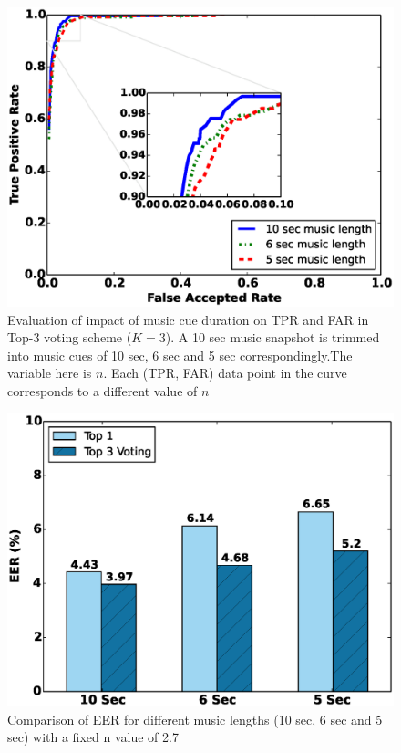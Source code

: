\begin{figure}[t]
\centering
\includegraphics [width=\columnwidth]{figure/top3_roc.eps}
\caption{Evaluation of impact of music cue duration on TPR and FAR in Top-3 
voting scheme ($K = 3$). A 10 sec music snapshot is trimmed into music cues of 
10 sec, 6 sec and 5 sec correspondingly.The variable here is $n$. Each (TPR, FAR) data point in the curve corresponds to a different value of $n$}
\label{fig:roc-top3}
\end{figure}

\begin{figure}[t]
\centering
\includegraphics [width=\columnwidth]{figure/exp2_vary_length.eps}
\caption{Comparison of EER for different music lengths (10 sec, 6 sec and 5 
sec) with a fixed n value of 2.7}
\label{fig:eer-length}
\end{figure}

